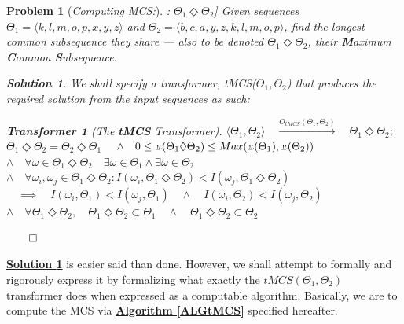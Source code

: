 \documentclass[a4paper, 18pt]{article} %
\newtheorem{transf}{Transformer}
\newtheorem{prob}{Problem}
\newtheorem{soln}{Solution}
\newcommand{\invpi}{\rotatebox[origin=c]{180}{$\pi$}}
\begin{document}
\begin{prob}[\textit{Computing MCS:}]: $\Theta_1 \Diamond \Theta_2$] 
\label{PROBMCS}
Given sequences $\Theta_1 = \langle k, l, m, o, p, x, y, z \rangle$ and $\Theta_2 = \langle b, c, a, y, z, k, l, m, o, p \rangle$, find the longest common subsequence they share --- also to be denoted $\Theta_1 \Diamond \Theta_2$, their \textbf{M}aximum \textbf{C}ommon \textbf{S}ubsequence.

\vspace{1em}
\begin{soln}
\label{SOLMCS}
We shall specify a transformer, tMCS($\Theta_1,\Theta_2$) that produces the required solution from the input sequences as such:

\begin{transf}[The \textbf{tMCS} Transformer]
\label{TRANSFMCS}
$\langle \Theta_1,\Theta_2 \rangle  \quad \xrightarrow{O_{tMCS}(\Theta_1,\Theta_2)} \quad \Theta_1 \Diamond \Theta_2;$\\
$\Theta_1 \Diamond \Theta_2 = \Theta_2 \Diamond \Theta_1$
$\quad \land \quad 0 \leq \invpi(\Theta_1 \Diamond \Theta_2) \leq Max(\invpi(\Theta_1), \invpi(\Theta_2))$\\
$\land \quad \forall \omega \in \Theta_1 \Diamond \Theta_2 \quad \exists \omega \in \Theta_1 \land \exists \omega \in \Theta_2$\\
$\land \quad \forall \omega_i, \omega_j \in \Theta_1 \Diamond \Theta_2 : I(\omega_i, \Theta_1 \Diamond \Theta_2) < I(\omega_j, \Theta_1 \Diamond \Theta_2) \quad $\\
$\quad \implies \quad I(\omega_i, \Theta_1) < I(\omega_j, \Theta_1) \quad \land \quad I(\omega_i, \Theta_2) < I(\omega_j, \Theta_2)$\\
$\land \quad \forall \Theta_1 \Diamond \Theta_2, \quad \Theta_1 \Diamond \Theta_2 \subset \Theta_1 \quad \land \quad \Theta_1 \Diamond \Theta_2 \subset \Theta_2$
\end{transf}
$\qed$
\end{soln}
\end{prob}
\vspace{1em}

\textbf{\hyperref[SOLMCS]{Solution \ref{SOLMCS}}} is easier said than done. However, we shall attempt to formally and rigorously express it by formalizing what exactly the $tMCS(\Theta_1,\Theta_2)$ transformer does when expressed as a computable algorithm. Basically, we are to compute the MCS via \textbf{\hyperref[ALGtMCS]{Algorithm \ref{ALGtMCS}}} specified hereafter.
\end{document}
